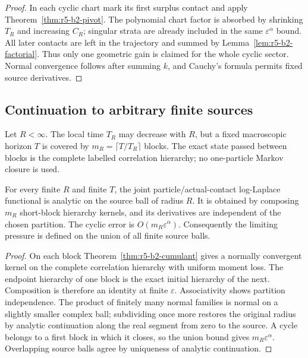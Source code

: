 \begin{proof}
In each cyclic chart mark its first surplus contact and apply
Theorem~\ref{thm:r5-b2-pivot}.  The polynomial chart factor is absorbed by
shrinking \(T_R\) and increasing \(C_R\); singular strata are already included
in the same \(\varepsilon^\alpha\) bound.  All later contacts are left in the
trajectory and summed by Lemma~\ref{lem:r5-b2-factorial}.  Thus only one
geometric gain is claimed for the whole cyclic sector.  Normal convergence
follows after summing \(k\), and Cauchy's formula permits fixed source
derivatives.
\end{proof}

\subsection{Continuation to arbitrary finite sources}

Let \(R<\infty\).  The local time \(T_R\) may decrease with \(R\), but a fixed
macroscopic horizon \(T\) is covered by
\(m_R=\lceil T/T_R\rceil\) blocks.  The exact state passed between blocks is
the complete labelled correlation hierarchy; no one-particle Markov closure
is used.

\begin{theorem}
\label{thm:r5-b2-continuation}
For every finite \(R\) and finite \(T\), the joint particle/actual-contact
log-Laplace functional is analytic on the source ball of radius \(R\).
It is obtained by composing \(m_R\) short-block hierarchy kernels, and its
derivatives are independent of the chosen partition.  The cyclic error is
\(O(m_R\varepsilon^\alpha)\).  Consequently the limiting pressure is defined
on the union of all finite source balls.
\end{theorem}

\begin{proof}
On each block Theorem~\ref{thm:r5-b2-cumulant} gives a normally convergent
kernel on the complete correlation hierarchy with uniform moment loss.
The endpoint hierarchy of one block is the exact initial hierarchy of the
next.  Composition is therefore an identity at finite \(\varepsilon\).
Associativity shows partition independence.  The product of finitely many
normal families is normal on a slightly smaller complex ball; subdividing
once more restores the original radius by analytic continuation along the
real segment from zero to the source.  A cycle belongs to a first block in
which it closes, so the union bound gives \(m_R\varepsilon^\alpha\).
Overlapping source balls agree by uniqueness of analytic continuation.
\end{proof}

